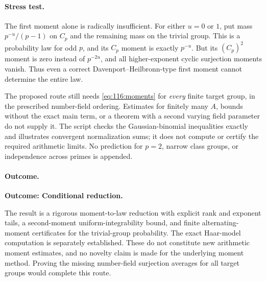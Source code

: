 \documentclass[11pt,a4paper]{article}
\numberwithin{equation}{section}
\begin{document}
\paragraph{Stress test.}
The first moment alone is radically insufficient. For either $u=0$ or $1$,
put mass $p^{-u}/(p-1)$ on $C_p$ and the remaining mass on the trivial
group. This is a probability law for odd $p$, and its $C_p$ moment is
exactly $p^{-u}$. But its $(C_p)^2$ moment is zero instead of $p^{-2u}$,
and all higher-exponent cyclic surjection moments vanish. Thus even a
correct Davenport--Heilbronn-type first moment cannot determine the
entire law.

The proposed route still needs \eqref{eq:116:moments} for \emph{every}
finite target group, in the prescribed number-field ordering. Estimates
for finitely many $A$, bounds without the exact main term, or a theorem
with a second varying field parameter do not supply it. The script checks
the Gaussian-binomial inequalities exactly and illustrates convergent
normalization sums; it does not compute or certify the required arithmetic
limits. No prediction for $p=2$, narrow class groups, or independence
across primes is appended.

\paragraph{Outcome.}
\textbf{Outcome: Conditional reduction.}

The result is a rigorous moment-to-law reduction with explicit rank and
exponent tails, a second-moment uniform-integrability bound, and finite
alternating-moment certificates for the trivial-group probability.
The exact Haar-model computation is separately established. These do not
constitute new arithmetic moment estimates, and no novelty claim is made
for the underlying moment method. Proving the missing number-field
surjection averages for all target groups would complete this route.
\end{document}
